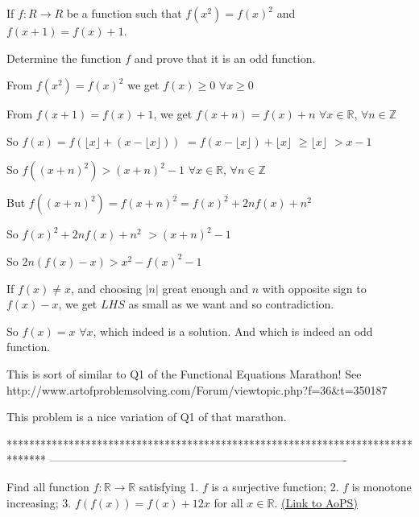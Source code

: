 \begin{solution}
	\begin{tcolorbox}If $f:R\rightarrow R$ be a function such that $f(x^2)=f(x)^2$ and $f(x+1)=f(x)+1$.

Determine the function $f$ and prove that it is an odd function.\end{tcolorbox}
From $f(x^2)=f(x)^2$ we get $f(x)\ge 0$ $\forall x\ge 0$

From $f(x+1)=f(x)+1$, we get $f(x+n)=f(x)+n$ $\forall x\in\mathbb R$, $\forall n\in\mathbb Z$

So $f(x)=f(\lfloor x\rfloor+(x-\lfloor x\rfloor))$ $=f(x-\lfloor x\rfloor)+\lfloor x\rfloor$ $\ge \lfloor x\rfloor$ $>x-1$

So $f((x+n)^2)>(x+n)^2-1$ $\forall x\in\mathbb R$, $\forall n\in\mathbb Z$

But $f((x+n)^2)=f(x+n)^2=f(x)^2+2nf(x)+n^2$

So $f(x)^2+2nf(x)+n^2$ $>(x+n)^2-1$

So $2n(f(x)-x)>x^2-f(x)^2-1$

If $f(x)\ne x$, and choosing $|n|$ great enough and $n$ with opposite sign to $f(x)-x$, we get $LHS$ as small as we want and so contradiction.

So $\boxed{f(x)=x}$ $\forall x$, which indeed is a solution.
And which is indeed an odd function.
\end{solution}



\begin{solution}
	This is sort of similar to Q1 of the Functional Equations Marathon! See http://www.artofproblemsolving.com/Forum/viewtopic.php?f=36&t=350187

This problem is a nice variation of Q1 of that marathon.
\end{solution}
*******************************************************************************
-------------------------------------------------------------------------------

\begin{problem}
	Find all function $f: \mathbb{R} \rightarrow  \mathbb{R}$ satisfying
1. $f$ is a surjective function;
2. $f$ is monotone increasing;
3. $f(f(x))=f(x)+12x$ for all $x \in \mathbb{R}$.
	\flushright \href{https://artofproblemsolving.com/community/c6h484843}{(Link to AoPS)}
\end{problem}



